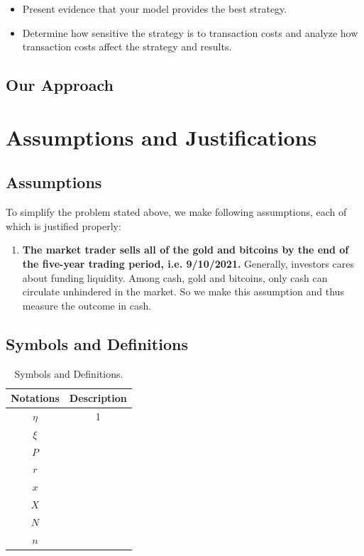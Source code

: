 \documentclass[12pt,a4paper]{article}
\begin{document}
\begin{spacing}{1.2}
\begin{itemize}
	\item Present evidence that your model provides the best strategy.
	
	\item Determine how sensitive the strategy is to transaction costs and analyze how transaction costs
	affect the strategy and results.
	
\end{itemize}

\subsection{Our Approach}



\section{Assumptions and Justifications}
\label{Assumptions_Justifications}

\subsection{Assumptions}
To simplify the problem stated above, we make following assumptions, each of which is justified properly: 
\begin{enumerate}
	\item \textbf{The market trader sells all of the gold and bitcoins by the end of the five-year trading period, i.e. 9/10/2021.} Generally, investors cares about funding liquidity. Among cash, gold and bitcoins, only cash can circulate unhindered in the market. So we make this assumption and thus measure the outcome in cash.
\end{enumerate}


\subsection{Symbols and Definitions}

\begin{table}[H]
\renewcommand{\arraystretch}{1.5}
\caption{Symbols and Definitions.}
\label{Table_Symbols}
\begin{center}
{\footnotesize
\begin{tabular}{c c}
\toprule
{Notations} & {Description} \\
\midrule
{$\eta$}    & {1} \\ 
{$\xi$}     & {} \\ 
$P$   & {} \\ 
$r$     & {} \\
$x$     & {} \\ 
$X$     & {} \\ 
$N$    & {} \\ 
$n$     & {} \\ 
\bottomrule
\end{tabular}}
\end{center}
\end{table}



\end{spacing}
\end{document}
